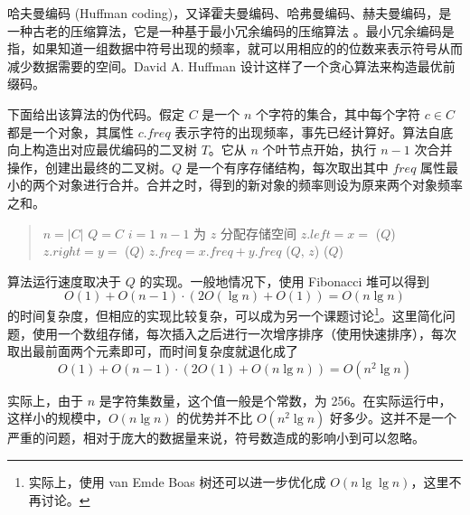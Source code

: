 哈夫曼编码 (Huffman coding)，又译霍夫曼编码、哈弗曼编码、赫夫曼编码，是一种古老的压缩算法，它是一种基于最小冗余编码的压缩算法 \cite{maic}。最小冗余编码是指，如果知道一组数据中符号出现的频率，就可以用相应的的位数来表示符号从而减少数据需要的空间。David A. Huffman \cite{huffman} 设计这样了一个贪心算法来构造最优前缀码。

下面给出该算法的伪代码。假定 $C$ 是一个 $n$ 个字符的集合，其中每个字符 $c\in C$ 都是一个对象，其属性 $c.freq$ 表示字符的出现频率，事先已经计算好。算法自底向上构造出对应最优编码的二叉树 $T$。它从 $n$ 个叶节点开始，执行 $n-1$ 次合并操作，创建出最终的二叉树。$Q$ 是一个有序存储结构，每次取出其中 $freq$ 属性最小的两个对象进行合并。合并之时，得到的新对象的频率则设为原来两个对象频率之和。

\begin{quote}
\begin{codebox}
\li $n = |C|$
\li $Q = C$
\li \For $i = 1$ \To $n-1$ \Do
\li   为 $z$ 分配存储空间
\li   $z.left = x = $ ($Q$)
\li   $z.right = y = $ ($Q$)
\li   $z.freq = x.freq + y.freq$
\li   {}($Q$, $z$)
    \End
\li \Return {}($Q$)
\label{Huffman-pc}
\end{codebox}
\end{quote}

算法运行速度取决于 $Q$ 的实现。一般地情况下，使用 Fibonacci 堆可以得到
\[ O(1) + O(n-1)\cdot (2O(\lg n) + O(1)) = O(n\lg n)\]
的时间复杂度，但相应的实现比较复杂，可以成为另一个课题讨论\footnote{实际上，使用 van Emde Boas 树还可以进一步优化成 $O(n\lg\lg n)$，这里不再讨论。}。这里简化问题，使用一个数组存储，每次插入之后进行一次增序排序（使用快速排序），每次取出最前面两个元素即可，而时间复杂度就退化成了
\[ O(1) + O(n-1)\cdot (2O(1) + O(n\lg n)) = O(n^2\lg n)\]

实际上，由于 $n$ 是字符集数量，这个值一般是个常数，为 256。在实际运行中，这样小的规模中，$O(n\lg n)$ 的优势并不比 $O(n^2\lg n)$ 好多少。这并不是一个严重的问题，相对于庞大的数据量来说，符号数造成的影响小到可以忽略。

